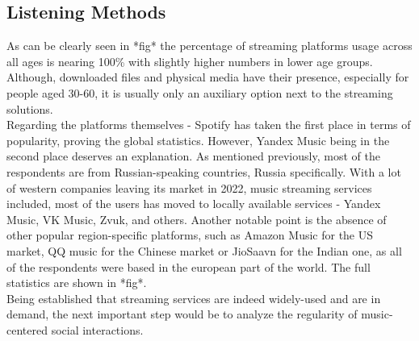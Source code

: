 \subsection{Listening Methods}
As can be clearly seen in *fig* the percentage of streaming platforms usage across all ages is nearing 100\% with
slightly higher numbers in lower age groups. Although, downloaded files and physical media have their presence, especially for
people aged 30-60, it is usually only an auxiliary option next to the streaming solutions.
\\
Regarding the platforms themselves - Spotify has taken the first place in terms of popularity, proving the
global statistics\cite{spotifypopularity}. However, Yandex Music being in the second place deserves an explanation.
As mentioned previously, most of the respondents are from Russian-speaking countries, Russia specifically.
With a lot of western companies leaving its market in 2022, music streaming services included, most of the users has
moved to locally available services - Yandex Music, VK Music, Zvuk, and others.
Another notable point is the absence of other popular region-specific platforms, such as Amazon Music for the US market,
QQ music for the Chinese market or JioSaavn for the Indian one,
as all of the respondents were based in the european part of the world.
The full statistics are shown in *fig*.\\
Being established that streaming services are indeed widely-used and are in demand, the next important step would be
to analyze the regularity of music-centered social interactions.

